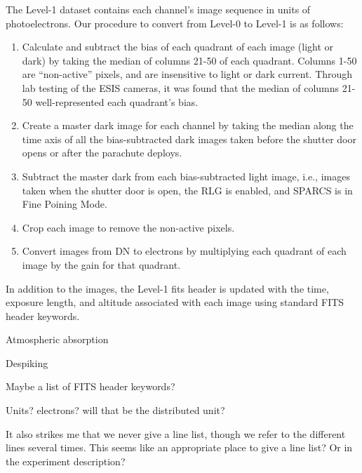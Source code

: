     	
    	The Level-1 dataset contains each channel's image sequence in units of photoelectrons.
    	Our procedure to convert from Level-0 to Level-1 is as follows:
    	
    	\begin{enumerate}
    	    \item Calculate and subtract the bias of each quadrant of each image (light or dark) by taking the median of columns 21-50 of each quadrant. Columns 1-50 are ``non-active'' pixels, and are insensitive to light or dark current. Through lab testing of the ESIS cameras, it was found that the median of columns 21-50 well-represented each quadrant's bias.   
    	    \item Create a master dark image for each channel by taking the median along the time axis of all the bias-subtracted dark images taken before the shutter door opens or after the parachute deploys.
    	    \item Subtract the master dark from each bias-subtracted light image, i.e., images taken when the shutter door is open, the RLG is enabled, and SPARCS is in Fine Poining Mode.
    	    \item Crop each image to remove the non-active pixels.
    	    \item Convert images from DN to electrons by multiplying each quadrant of each image by the gain for that quadrant.
    	\end{enumerate}
    	
	In addition to the images, the Level-1 fits header is updated with the time, exposure length, and altitude associated with each image using standard FITS header keywords.  
	
	Atmospheric absorption
	
	Despiking
	
	Maybe a list of FITS header keywords?  
	
	Units?  electrons?  will that be the distributed unit?
	
	It also strikes me that we never give a line list, though we refer to the different lines several times.  This seems like an appropriate place to give a line list?  Or in the experiment description?

